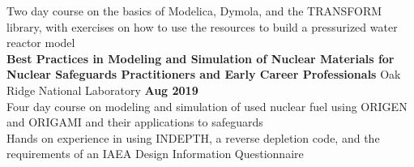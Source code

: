 \documentclass[margin,line]{resume}
\begin{document}
\begin{resume}
    Two day course on the basics of Modelica, Dymola, and the TRANSFORM library, with exercises on how to use the resources to build a pressurized water reactor model \\
    \textbf{Best Practices in Modeling and Simulation of Nuclear Materials for Nuclear Safeguards Practitioners and Early Career Professionals} 
    Oak Ridge National Laboratory \hfill \textbf{Aug 2019} \\
    Four day course on modeling and simulation of used nuclear fuel using ORIGEN and ORIGAMI and their applications to safeguards \\
    Hands on experience in using INDEPTH, a reverse depletion code, and the requirements of an IAEA Design Information Questionnaire \\ 
    





\end{resume}
\end{document}
